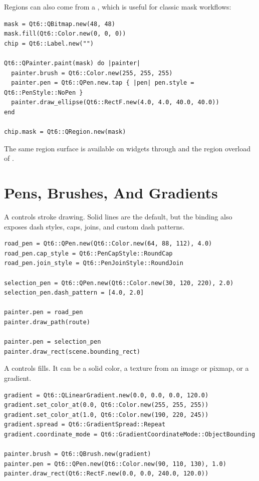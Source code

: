 Regions can also come from a , which is useful for classic mask workflows:

\begin{lstlisting}[style=crystal]
mask = Qt6::QBitmap.new(48, 48)
mask.fill(Qt6::Color.new(0, 0, 0))
chip = Qt6::Label.new("")

Qt6::QPainter.paint(mask) do |painter|
  painter.brush = Qt6::Color.new(255, 255, 255)
  painter.pen = Qt6::QPen.new.tap { |pen| pen.style = Qt6::PenStyle::NoPen }
  painter.draw_ellipse(Qt6::RectF.new(4.0, 4.0, 40.0, 40.0))
end

chip.mask = Qt6::QRegion.new(mask)
\end{lstlisting}

The same region surface is available on widgets through  and the region overload of .

\section{Pens, Brushes, And Gradients}

A  controls stroke drawing. Solid lines are the default, but the binding also exposes dash styles, caps, joins, and custom dash patterns.

\begin{lstlisting}[style=crystal]
road_pen = Qt6::QPen.new(Qt6::Color.new(64, 88, 112), 4.0)
road_pen.cap_style = Qt6::PenCapStyle::RoundCap
road_pen.join_style = Qt6::PenJoinStyle::RoundJoin

selection_pen = Qt6::QPen.new(Qt6::Color.new(30, 120, 220), 2.0)
selection_pen.dash_pattern = [4.0, 2.0]

painter.pen = road_pen
painter.draw_path(route)

painter.pen = selection_pen
painter.draw_rect(scene.bounding_rect)
\end{lstlisting}

A  controls fills. It can be a solid color, a texture from an image or pixmap, or a gradient.

\begin{lstlisting}[style=crystal]
gradient = Qt6::QLinearGradient.new(0.0, 0.0, 0.0, 120.0)
gradient.set_color_at(0.0, Qt6::Color.new(255, 255, 255))
gradient.set_color_at(1.0, Qt6::Color.new(190, 220, 245))
gradient.spread = Qt6::GradientSpread::Repeat
gradient.coordinate_mode = Qt6::GradientCoordinateMode::ObjectBounding

painter.brush = Qt6::QBrush.new(gradient)
painter.pen = Qt6::QPen.new(Qt6::Color.new(90, 110, 130), 1.0)
painter.draw_rect(Qt6::RectF.new(0.0, 0.0, 240.0, 120.0))
\end{lstlisting}

